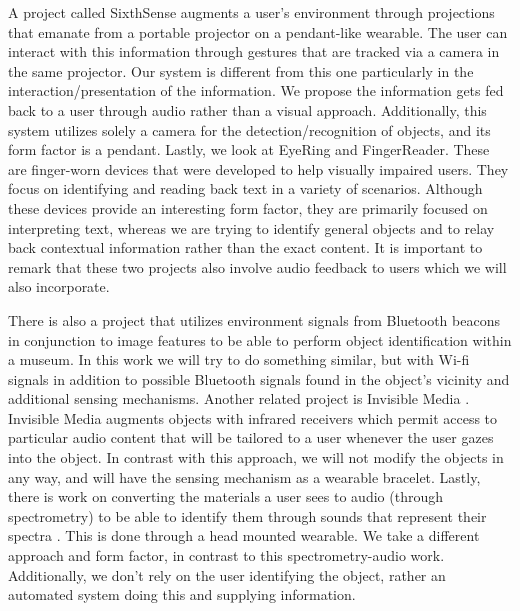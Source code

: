 A project called SixthSense \cite{mistry_maes_2009} augments a user's environment through projections that emanate from a portable projector on a pendant-like wearable.  The user can interact with this information through gestures that are tracked via a camera in the same projector.  Our system is different from this one particularly in the interaction/presentation of the information.  We propose the information gets fed back to a user through audio rather than a visual approach. Additionally, this system utilizes solely a camera for the detection/recognition of objects, and its form factor is a pendant. Lastly, we look at EyeRing \cite{nanayakkara_shilkrot_maes_2012} and FingerReader\cite{shilkrot_huber_ee_maes_nanayakkara_2015}. 
These are finger-worn devices that were developed to help visually impaired users.  They focus on identifying and reading back text in a variety of scenarios.  Although these devices provide an interesting form factor, they are primarily focused on interpreting text, whereas we are trying to identify general objects and to relay back contextual information rather than the exact content.  It is important to remark that these two projects also involve audio feedback to users which we will also incorporate. 

There is also a project that utilizes environment signals from Bluetooth beacons in conjunction to image features to be able to perform object identification within a museum\cite{bruns_brombach_zeidler_bimber_2007}.  In this work we will try to do something similar, but with Wi-fi signals in addition to possible Bluetooth signals found in the object's vicinity and additional sensing mechanisms.  Another related project is Invisible Media \cite{merrill2005invisible}.  Invisible Media augments objects with infrared receivers which permit access to particular audio content that will be tailored to a user whenever the user gazes into the object.  In contrast with this approach, we will not modify the objects in any way, and will have the sensing mechanism as a wearable bracelet. Lastly, there is work on converting the materials a user sees to audio (through spectrometry) to be able to identify them through  sounds that represent their spectra \cite{foner1999artificial}. This is done through a head mounted wearable.  We take a different approach and form factor, in contrast to this spectrometry-audio work.  Additionally, we don't rely on the user identifying the object, rather an automated system doing this and supplying information.

